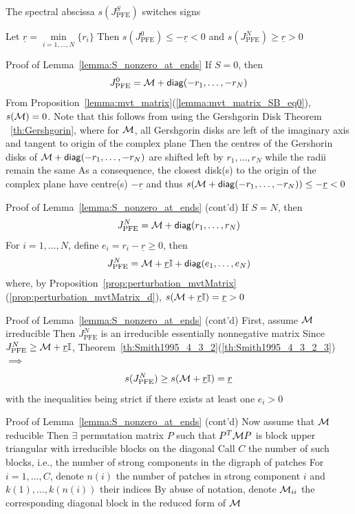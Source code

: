 \documentclass[aspectratio=169]{beamer}
\begin{document}
\begin{frame}{The spectral abscissa $s(J_{\textrm{PFE}}^S)$ switches signs}
	\begin{lemma}\label{lemma:S_nonzero_at_ends}
		Let $\underline{r}=\min\limits_{i=1,\ldots, N} \{r_i\}$
		\vskip0.5cm
		Then $s(J_{\textrm{PFE}}^0) \leq -\underline{r} <0$ and  $s(J_{\textrm{PFE}}^N)\geq \underline{r} >0$
	\end{lemma}
\end{frame}

\begin{frame}{Proof of Lemma~\ref{lemma:S_nonzero_at_ends}}
	If $S=0$, then
	\[
	J_{\textrm{PFE}}^0=\mathcal{M}+\mathsf{diag} (-r_1,\ldots,-r_N)
	\]
	\vfill
	From Proposition~\ref{lemma:mvt_matrix}(\ref{lemma:mvt_matrix_SB_eq0}), $s(\mathcal{M}) = 0$. 
	Note that this follows from using the Gershgorin Disk Theorem ~\ref{th:Gershgorin}, where for $\mathcal{M}$, all Gershgorin disks are left of the imaginary axis and tangent to origin of the complex plane
	\vfill
	Then the centres of the Gershorin disks of $\mathcal{M}+\mathsf{diag} (-r_1,\ldots,-r_N)$ are shifted left by $r_1,\ldots,r_N$ while the radii remain the same
	\vfill
	As a consequence, the closest disk(s) to the origin of the complex plane have centre(s) $-\underline{r}$ and thus $s(\mathcal{M}+\mathsf{diag} (-r_1,\ldots,-r_N))\leq-\underline{r}<0$
\end{frame}

\begin{frame}{Proof of Lemma~\ref{lemma:S_nonzero_at_ends} (cont'd)}
	If $S=N$, then
	\[
	J_{\textrm{PFE}}^N=\mathcal{M}+\mathsf{diag} (r_1,\ldots,r_N)
	\]
	\vfill
	For $i=1,\ldots,N$, define $e_i=r_i-\underline{r}\geq 0$, then
	\[
	J_{\textrm{PFE}}^N=\mathcal{M}+\underline{r}\mathbb{I}+\mathsf{diag} (e_1,\ldots,e_N)
	\]
	where, by Proposition~\ref{prop:perturbation_mvtMatrix}(\ref{prop:perturbation_mvtMatrix_d}), $s(\mathcal{M}+\underline{r}\mathbb{I})=\underline{r}>0$
\end{frame}

\begin{frame}{Proof of Lemma~\ref{lemma:S_nonzero_at_ends} (cont'd)}
	First, assume $\mathcal{M}$ irreducible
	\vfill
	Then $J_{\textrm{PFE}}^N$ is an irreducible essentially nonnegative matrix
	\vfill
	Since $J_{\textrm{PFE}}^N\geq \mathcal{M}+\underline{r}\mathbb{I}$, Theorem~\ref{th:Smith1995_4_3_2}(\ref{th:Smith1995_4_3_2_3}) $\implies$
	\[
		s(J_{\textrm{PFE}}^N)\geq s(\mathcal{M}+\underline{r}\mathbb{I})=\underline{r}
	\]
	with the inequalities being strict if there exists at least one $e_i>0$
\end{frame}

\begin{frame}{Proof of Lemma~\ref{lemma:S_nonzero_at_ends} (cont'd)}
	Now assume that $\mathcal{M}$ reducible
	\vfill
	Then $\exists$ permutation matrix $P$ such that $P^T\mathcal{M} P$ is block upper triangular with irreducible blocks on the diagonal
	\vfill
	Call $C$ the number of such blocks, i.e., the number of strong components in the digraph of patches
	\vfill
	For $i=1,\ldots,C$, denote $n(i)$ the number of patches in strong component $i$ and $k(1),\ldots,k(n(i))$ their indices
	\vfill
	By abuse of notation, denote $\mathcal{M}_{ii}$ the corresponding diagonal block in the reduced form of $\mathcal{M}$
\end{frame}
\end{document}
